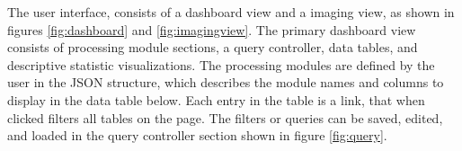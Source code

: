 The user interface, consists of a dashboard view and a imaging view, as shown in figures \ref{fig:dashboard} and \ref{fig:imagingview}. The primary dashboard view consists of processing module sections, a query controller, data tables, and descriptive statistic visualizations. The processing modules are defined by the user in the JSON structure, which describes the module names and columns to display in the data table below. Each entry in the table is a link, that when clicked filters all tables on the page. The filters or queries can be saved, edited, and loaded in the query controller section shown in figure \ref{fig:query}. 